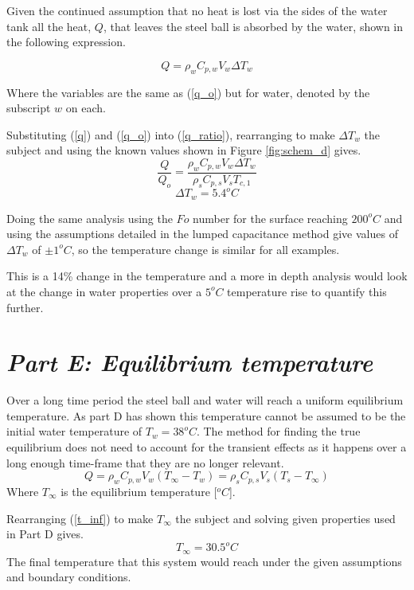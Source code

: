 \documentclass[11pt]{article}
\begin{document}
Given the continued assumption that no heat is lost via the sides of the water tank all the heat, $Q$, that leaves the steel ball is absorbed by the water, shown in the following expression.

\begin{equation}\label{q}
	Q = \rho_w C_{p,w} V_w \Delta T_{w}
\end{equation}

Where the variables are the same as (\ref{q_o}) but for water, denoted by the subscript $w$ on each.

Substituting (\ref{q}) and (\ref{q_o}) into (\ref{q_ratio}), rearranging to make $\Delta T_w$ the subject and using the known values shown in Figure \ref{fig:schem_d} gives.
\begin{equation}\label{key}
	\frac{Q}{Q_o} = \frac{\rho_w C_{p,w} V_w \Delta T_{w}}{\rho_s C_{p,s} V_s T_{c,1}}
\end{equation}
\begin{equation}\label{delta_t}
	\Delta T_w = 5.4 ^oC
\end{equation}

Doing the same analysis using the $Fo$ number for the surface reaching $200^oC$ and using the assumptions detailed in the lumped capacitance method give values of $\Delta T_w$ of $\pm1^oC$, so the temperature change is similar for all examples.

This is a 14\% change in the temperature and a more in depth analysis would look at the change in water properties over a $5^oC$ temperature rise to quantify this further.

\FloatBarrier
\section{\emph{Part E: Equilibrium temperature}}
Over a long time period the steel ball and water will reach a uniform equilibrium temperature. As part D has shown this temperature cannot be assumed to be the initial water temperature of $T_w = 38^oC$. The method for finding the true equilibrium does not need to account for the transient effects as it happens over a long enough time-frame that they are no longer relevant.
\begin{equation}\label{t_inf}
	Q = \rho_w C_{p,w} V_w (T_\infty- T_w) = \rho_s C_{p,s} V_s (T_s-T_\infty)
\end{equation}
Where $T_\infty$ is the equilibrium temperature [$^oC$].

Rearranging (\ref{t_inf}) to make $T_\infty$ the subject and solving given properties used in Part D gives.
\boldmath
\begin{equation}\label{key}
	T_\infty = 30.5^oC
\end{equation}
The final temperature that this system would reach under the given assumptions and boundary conditions.
\unboldmath


\end{document}
